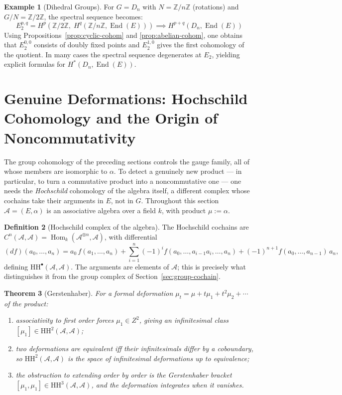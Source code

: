 \documentclass[11pt,a4paper,openany]{book}
\theoremstyle{plain}
\newtheorem{theorem}{Theorem}[chapter]
\theoremstyle{definition}
\newtheorem{definition}[theorem]{Definition}
\newtheorem{example}[theorem]{Example}
\newcommand{\actspace}{E}
\newcommand{\groupG}{G}
\newcommand{\ZZ}{\mathbb{Z}}
\DeclareMathOperator{\End}{End}
\DeclareMathOperator{\Hom}{Hom}
\begin{document}
\begin{example}[Dihedral Groups]\label{ex:dihedral-spectral}
For $\groupG = D_n$ with $N = \ZZ/n\ZZ$ (rotations) and $\groupG/N = \ZZ/2\ZZ$, the spectral sequence becomes:
\[
E_2^{p,q} = H^p(\ZZ/2\ZZ, \;H^q(\ZZ/n\ZZ, \End(\actspace))) \implies H^{p+q}(D_n, \End(\actspace))
\]
Using Propositions~\ref{prop:cyclic-cohom} and \ref{prop:abelian-cohom}, one obtains that $E_2^{0,0}$ consists of doubly fixed points and $E_2^{1,0}$ gives the first cohomology of the quotient. In many cases the spectral sequence degenerates at $E_2$, yielding explicit formulas for $H^\ast(D_n, \End(\actspace))$.
\end{example}

\section{Genuine Deformations: Hochschild Cohomology and the Origin of Noncommutativity}\label{sec:hochschild-genuine}

The group cohomology of the preceding sections controls the gauge family, all of whose members are isomorphic to $\alpha$. To detect a genuinely new product --- in particular, to turn a commutative product into a noncommutative one --- one needs the \emph{Hochschild} cohomology of the algebra itself, a different complex whose cochains take their arguments in $\actspace$, not in $\groupG$. Throughout this section $\mathcal{A}=(\actspace,\alpha)$ is an associative algebra over a field $k$, with product $\mu:=\alpha$.

\begin{definition}[Hochschild complex of the algebra]\label{def:genuine-hochschild}
The Hochschild cochains are $C^n(\mathcal{A},\mathcal{A})=\Hom_k(\mathcal{A}^{\otimes n},\mathcal{A})$, with differential
\[
(df)(a_0,\dots,a_n)=a_0\,f(a_1,\dots,a_n)+\sum_{i=1}^{n}(-1)^i f(a_0,\dots,a_{i-1}a_i,\dots,a_n)+(-1)^{n+1}f(a_0,\dots,a_{n-1})\,a_n,
\]
defining $\mathrm{HH}^\bullet(\mathcal{A},\mathcal{A})$. The arguments are elements of $\mathcal{A}$; this is precisely what distinguishes it from the group complex of Section~\ref{sec:group-cochain}.
\end{definition}

\begin{theorem}[Gerstenhaber]\label{thm:gerstenhaber}
For a formal deformation $\mu_t=\mu+t\mu_1+t^2\mu_2+\cdots$ of the product:
\begin{enumerate}
    \item associativity to first order forces $\mu_1\in Z^2$, giving an infinitesimal class $[\mu_1]\in\mathrm{HH}^2(\mathcal{A},\mathcal{A})$;
    \item two deformations are equivalent iff their infinitesimals differ by a coboundary, so $\mathrm{HH}^2(\mathcal{A},\mathcal{A})$ is the space of infinitesimal deformations up to equivalence;
    \item the obstruction to extending order by order is the Gerstenhaber bracket $[\mu_1,\mu_1]\in\mathrm{HH}^3(\mathcal{A},\mathcal{A})$, and the deformation integrates when it vanishes.
\end{enumerate}
\end{theorem}
\end{document}
